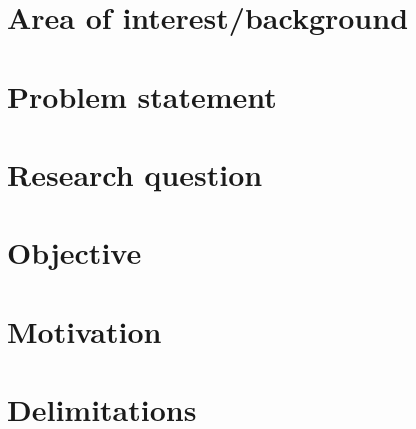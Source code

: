 \section{Area of interest/background}

\section{Problem statement}

\section{Research question}

\section{Objective}

\section{Motivation}

\section{Delimitations}